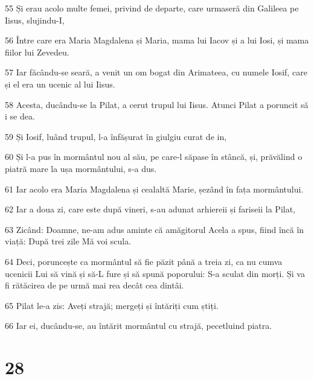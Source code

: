 \par 55 Și erau acolo multe femei, privind de departe, care urmaseră din Galileea pe Iisus, slujindu-I,
\par 56 Între care era Maria Magdalena și Maria, mama lui Iacov și a lui Iosi, și mama fiilor lui Zevedeu.
\par 57 Iar făcându-se seară, a venit un om bogat din Arimateea, cu numele Iosif, care și el era un ucenic al lui Iisus.
\par 58 Acesta, ducându-se la Pilat, a cerut trupul lui Iisus. Atunci Pilat a poruncit să i se dea.
\par 59 Și Iosif, luând trupul, l-a înfășurat în giulgiu curat de in,
\par 60 Și l-a pus în mormântul nou al său, pe care-l săpase în stâncă, și, prăvălind o piatră mare la ușa mormântului, s-a dus.
\par 61 Iar acolo era Maria Magdalena și cealaltă Marie, șezând în fața mormântului.
\par 62 Iar a doua zi, care este după vineri, s-au adunat arhiereii și fariseii la Pilat,
\par 63 Zicând: Doamne, ne-am adus aminte că amăgitorul Acela a spus, fiind încă în viață: După trei zile Mă voi scula.
\par 64 Deci, poruncește ca mormântul să fie păzit până a treia zi, ca nu cumva ucenicii Lui să vină și să-L fure și să spună poporului: S-a sculat din morți. Și va fi rătăcirea de pe urmă mai rea decât cea dintâi.
\par 65 Pilat le-a zis: Aveți strajă; mergeți și întăriți cum știți.
\par 66 Iar ei, ducându-se, au întărit mormântul cu strajă, pecetluind piatra.

\chapter{28}

